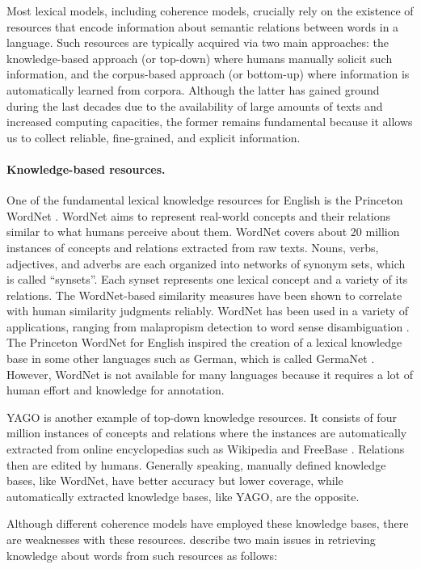 Most lexical models, including coherence models, crucially rely on the existence of resources that encode information about semantic relations between words in a language. 
Such resources are typically acquired via two main approaches: the knowledge-based approach (or top-down) where humans manually solicit such information, and the corpus-based approach (or bottom-up) where information is automatically learned from corpora. 
Although the latter has gained ground during the last decades due to the availability of large amounts of texts and increased computing capacities, the former remains fundamental because it allows us to collect reliable, fine-grained, and explicit information. 

\paragraph{Knowledge-based resources.}
One of the fundamental lexical knowledge resources for English is the Princeton WordNet \cite{fellbaum98}.  
WordNet aims to represent real-world concepts and their relations similar to what humans perceive about them. 
WordNet covers about 20 million instances of concepts and relations extracted from raw texts. 
Nouns, verbs, adjectives, and adverbs are each organized into networks of synonym sets, which is called ``synsets''. 
Each synset represents one lexical concept and a variety of its relations. 
The WordNet-based similarity measures have been shown to correlate with human similarity judgments reliably. 
WordNet has been used in a variety of applications, ranging from malapropism detection to word sense disambiguation \cite{budanitsky06}.  
The Princeton WordNet for English inspired the creation of a lexical knowledge base in some other languages such as German, which is called GermaNet \cite{hamp97}. 
However, WordNet is not available for many languages because it requires a lot of human effort and knowledge for annotation. 

YAGO \cite{hoffart13} is another example of top-down knowledge resources.  
It consists of four million instances of concepts and relations where the instances are automatically extracted from online encyclopedias such as Wikipedia \cite{denoyer06} and FreeBase \cite{bollacker08}. 
Relations then are edited by humans. 
Generally speaking, manually defined knowledge bases, like WordNet, have better accuracy but lower coverage, while automatically extracted knowledge bases, like YAGO, are the opposite. 

Although different coherence models have employed these knowledge bases, there are weaknesses with these resources.   
 describe two main issues in retrieving knowledge about words from such resources as follows: 

